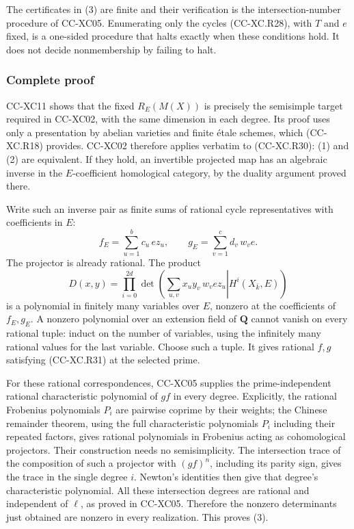The certificates in (3) are finite and their verification is the
intersection-number procedure of CC-XC05. Enumerating only the cycles
(CC-XC.R28), with \(T\) and \(e\) fixed, is a one-sided procedure that
halts exactly when these conditions hold. It does not decide
nonmembership by failing to halt.

\subsubsection{Complete proof}\label{complete-proof-1}

CC-XC11 shows that the fixed \(R_E(M(X))\) is precisely the semisimple
target required in CC-XC02, with the same dimension in each degree. Its
proof uses only a presentation by abelian varieties and finite étale
schemes, which (CC-XC.R18) provides. CC-XC02 therefore applies verbatim
to (CC-XC.R30): (1) and (2) are equivalent. If they hold, an invertible
projected map has an algebraic inverse in the \(E\)-coefficient
homological category, by the duality argument proved there.

Write such an inverse pair as finite sums of rational cycle
representatives with coefficients in \(E\): \[
 f_E=\sum_{u=1}^{b}c_u\,e z_u,\qquad
 g_E=\sum_{v=1}^{c}d_v\,w_v e.
 \] The projector is already rational. The product \[
 D(x,y)=\prod_{i=0}^{2d}
       \det\!\left(
       \left.\sum_{u,v}x_u y_v\,w_v e z_u
       \right|H^i(X_{\bar k},E)\right)
                                                        \tag{CC-XC.R32}
 \] is a polynomial in finitely many variables over \(E\), nonzero at
the coefficients of \(f_E,g_E\). A nonzero polynomial over an extension
field of \(\mathbf Q\) cannot vanish on every rational tuple: induct on
the number of variables, using the infinitely many rational values for
the last variable. Choose such a tuple. It gives rational \(f,g\)
satisfying (CC-XC.R31) at the selected prime.

For these rational correspondences, CC-XC05 supplies the
prime-independent rational characteristic polynomial of \(gf\) in every
degree. Explicitly, the rational Frobenius polynomials \(P_i\) are
pairwise coprime by their weights; the Chinese remainder theorem, using
the full characteristic polynomials \(P_i\) including their repeated
factors, gives rational polynomials in Frobenius acting as cohomological
projectors. Their construction needs no semisimplicity. The intersection
trace of the composition of such a projector with \((gf)^n\), including
its parity sign, gives the trace in the single degree \(i\). Newton's
identities then give that degree's characteristic polynomial. All these
intersection degrees are rational and independent of \(\ell\), as proved
in CC-XC05. Therefore the nonzero determinants just obtained are nonzero
in every realization. This proves (3).

